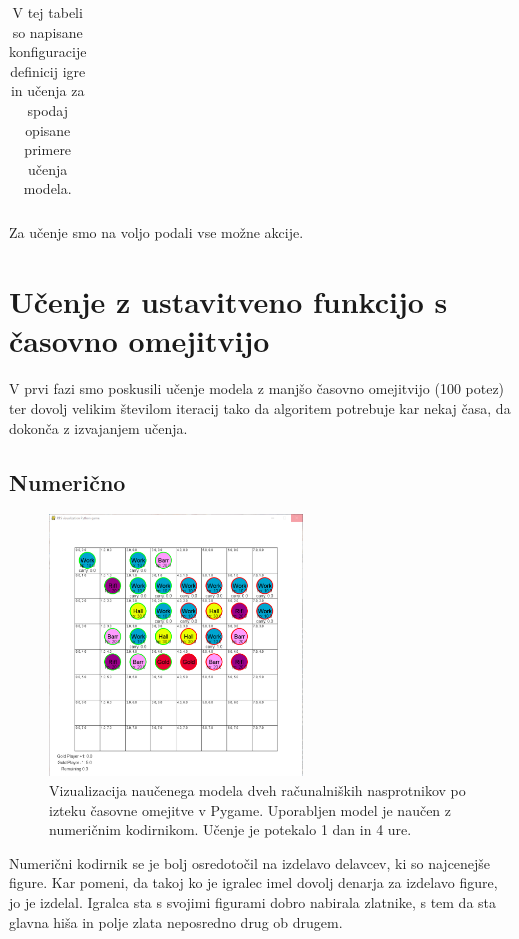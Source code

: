 \documentclass[a4paper, 12pt]{book}
\begin{document}
\begin{table}
\begin{center}
\begin{tabular}{p{0.4\linewidth}|p{0.1\linewidth}|p{0.1\linewidth}|p{0.1\linewidth}|p{0.1\linewidth}}
		\end{tabular}
	\end{center}
	\caption{V tej tabeli so napisane konfiguracije definicij igre in učenja za spodaj opisane primere učenja modela.}
	\label{tabelLearnConfig}
\end{table}

Za učenje smo na voljo podali vse možne akcije.

\section{Učenje z ustavitveno funkcijo s časovno omejitvijo}
\label{resultFirst}
V prvi fazi smo poskusili učenje modela z manjšo časovno omejitvijo (100 potez) ter dovolj velikim številom iteracij tako da algoritem potrebuje kar nekaj časa, da dokonča z izvajanjem učenja.


\subsection{Numerično}

\begin{figure}[h]
	\begin{center}
		\includegraphics[width=0.6\textwidth]{photos/first-numeric.pdf}
	\end{center}
	\caption{Vizualizacija naučenega modela dveh računalniških nasprotnikov po izteku časovne omejitve v Pygame. 
		Uporabljen model je naučen z numeričnim kodirnikom. Učenje je potekalo 1 dan in 4 ure.}
	\label{vizualizacijaRezultatovNumericniKodirnik100Timeout}
\end{figure}


Numerični kodirnik se je bolj osredotočil na izdelavo delavcev, ki so najcenejše figure. 
Kar pomeni, da takoj ko je igralec imel dovolj denarja za izdelavo figure, jo je izdelal.
Igralca sta s svojimi figurami dobro nabirala zlatnike, s tem da sta glavna hiša in polje zlata neposredno drug ob drugem.
\end{document}

